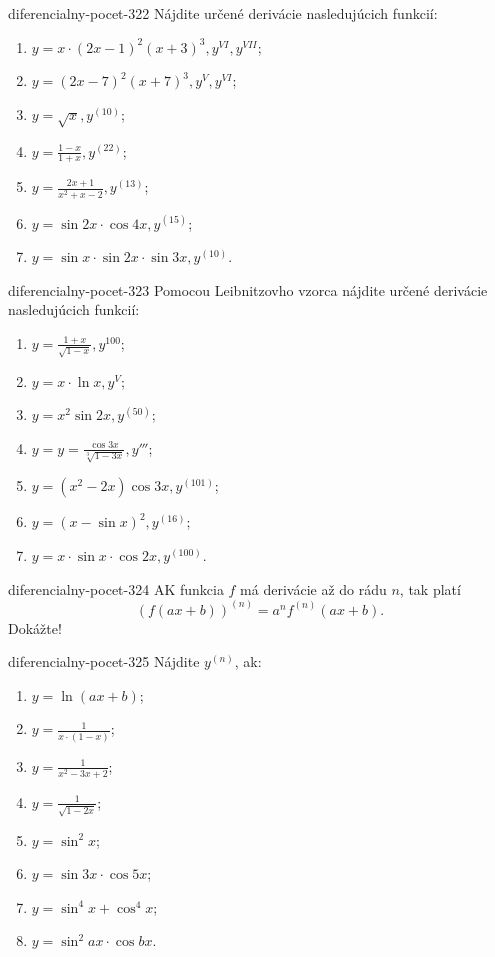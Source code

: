 \begin{defproblem}{diferencialny-pocet-322}
Nájdite určené derivácie nasledujúcich funkcií:
\begin{enumerate}
\item $y=x\cdot (2x-1)^2(x+3)^3,y^{VI},y^{VII}$;
\item $y=(2x-7)^2(x+7)^3,y^{V},y^{VI}$;
\item $y=\sqrt{x},y^{(10)}$;
\item $y=\frac{1-x}{1+x},y^{(22)}$;
\item $y=\frac{2x+1}{x^2+x-2},y^{(13)}$;
\item $y=\sin 2x\cdot\cos 4x,y^{(15)}$;
\item $y=\sin x\cdot \sin 2x \cdot \sin 3x,y^{(10)}$.
\end{enumerate}
\end{defproblem}

\begin{defproblem}{diferencialny-pocet-323}
Pomocou Leibnitzovho vzorca nájdite určené derivácie nasledujúcich funkcií:
\begin{enumerate}
\item $y=\frac{1+x}{\sqrt{1-x}},y^{100}$;
\item $y=x\cdot\ln x,y^{V}$;
\item $y=x^2\sin 2x,y^{(50)}$;
\item $y=y=\frac{\cos 3x}{\sqrt[3]{1-3x}},y'''$;
\item $y=(x^2-2x)\cos 3x,y^{(101)}$;
\item $y=(x-\sin x)^2,y^{(16)}$;
\item $y=x\cdot\sin x\cdot\cos 2x,y^{(100)}$.
\end{enumerate}
\end{defproblem}

\begin{defproblem}{diferencialny-pocet-324}
AK funkcia $f$ má derivácie až do rádu $n$, tak platí
$$(f(ax+b))^{(n)}=a^nf^{(n)}(ax+b).$$ Dokážte!
\end{defproblem}

\begin{defproblem}{diferencialny-pocet-325}
Nájdite $y^{(n)}$, ak:
\begin{multicols}{2}
\begin{enumerate}
    \item $y=\ln (ax+b)$;
    \item $y=\frac{1}{x\cdot(1-x)}$;
    \item $y=\frac{1}{x^2-3x+2}$;
    \item $y=\frac{1}{\sqrt{1-2x}}$;
    \item $y=\sin^2 x$;
    \item $y=\sin3x \cdot \cos 5x$;
    \item $y=\sin^4 x+\cos^4 x$;
    \item $y=\sin^2 ax \cdot \cos bx$.
\end{enumerate}
\end{multicols}
\end{defproblem}

